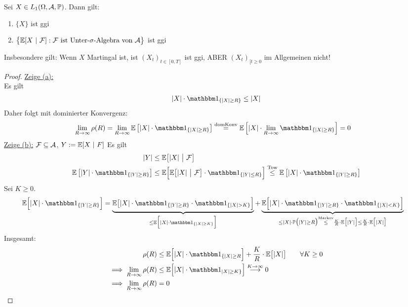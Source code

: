 \setcounter{satz}{2}
\begin{lemma}\label{lemma4.3}
Sei $X\in L_1(\Omega,\mathcal{A},\mathbb{P})$. Dann gilt:
\begin{enumerate}[label=(\alph*)]
\item $\lbrace X\rbrace$ ist ggi
\item $\big\lbrace\mathbb{E}[X~|~\mathcal{F}]:\mathcal{F}\text{ ist Unter-$\sigma$-Algebra von }\mathcal{A}\big\rbrace$ ist ggi
\end{enumerate}
\end{lemma}
\begin{bemerkung}
Insbesondere gilt: Wenn $X$ Martingal ist, ist $(X_t)_{t\in[0,T]}$ ist ggi, ABER $(X_t)_{[t\geq0}$ im Allgemeinen nicht!
\end{bemerkung}
\begin{proof}
\underline{Zeige (a):}\\
Es gilt
\begin{align*}
|X|\cdot\indi_{\lbrace|X|\geq R\rbrace}\leq |X|
\end{align*}
Daher folgt mit dominierter Konvergenz:
\begin{align*}
\lim\limits_{R\to\infty}\rho(R)
&=\lim\limits_{R\to\infty}\E\left[|X|\cdot\indi_{\lbrace |X|\geq R\rbrace}\right]
\stackeq{\text{domKonv}}\E\left[|X|\cdot\lim\limits_{R\to\infty}\indi_{\lbrace|X|\geq R\rbrace}\right]
=0
\end{align*}
\underline{Zeige (b):} $\mathcal{F}\subseteq\mathcal{A}$, $Y:=\mathbb{E}[X~|~F]$ Es gilt
\begin{align*}
|Y|&\leq\E\big[|X|~\big|~\F\big]\\
\E\left[|Y|\cdot\indi_{\lbrace|Y|\geq R\rbrace}\right]
&\leq\E\Big[\E\big[|X|~\big|~\F\big]\cdot\indi_{\lbrace |Y|\leq R\rbrace}\Big]
\stackrel{\text{Tow}}{\leq}
\E\left[|X|\cdot\indi_{\lbrace|Y|\geq R\rbrace}\right]
\end{align*}
Sei $K\geq0$.
\begin{align*}
\E\Big[|X|\cdot\indi_{\lbrace|Y|\geq R\rbrace}\Big]
&=\underbrace{\E\big[|X|\cdot\indi_{\lbrace |Y|\geq R\rbrace}\cdot\indi_{\lbrace |X|>K\rbrace}\Big]}_{\leq\E\Big[|X|\cdot\indi_{\lbrace |X|\geq K\rbrace}\Big]}+
\underbrace{\E\Big[|X|\cdot\indi_{\lbrace|Y|\geq R\rbrace}\cdot\indi_{\lbrace|X|<K\rbrace}\Big]}_{\leq|X|\cdot\P\big(|Y|\geq R\big)\stackrel{\text{Markov}}{\leq}\frac{K}{R}\cdot\E\big[|Y|\big]\leq\frac{K}{R}\cdot\E\big[|X|\big]}
\end{align*}
Insgesamt:
\begin{align*}
\rho(R)
&\leq\E\Big[|X|\cdot\indi_{\lbrace|X|\geq R}\Big]+\frac{K}{R}\cdot\E\big[|X|\big]\qquad\forall K\geq0\\
\implies
\lim\limits_{R\to\infty}\rho(R)
&\leq\E\Big[|X|\cdot\indi_{|X|\geq K\rbrace}\Big]\stackrel{K\to\infty}{\longrightarrow}0\\
\implies \lim\limits_{R\to\infty}\rho(R)&=0
\end{align*}
\end{proof}

